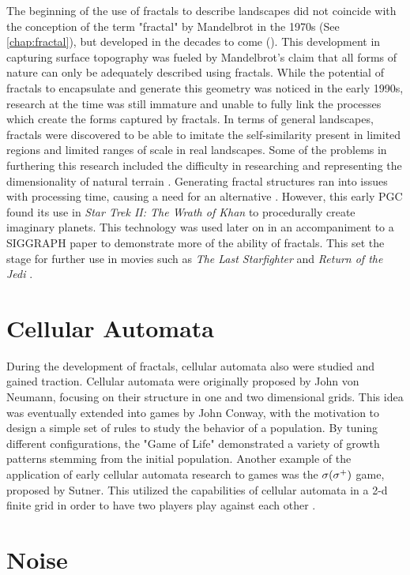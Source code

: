 \documentclass[10pt]{report}
\begin{document}
		The beginning of the use of fractals to describe landscapes did not coincide with the conception of the term "fractal" by Mandelbrot in the 1970s (See \autoref{chap:fractal}), but developed in the decades to come (). This development in capturing surface topography was fueled by Mandelbrot's claim that all forms of nature can only be adequately described using fractals. While the potential of fractals to encapsulate and generate this geometry was noticed in the early 1990s, research at the time was still immature and unable to fully link the processes which create the forms captured by fractals. In terms of general landscapes, fractals were discovered to be able to imitate the self-similarity present in limited regions and limited ranges of scale in real landscapes. Some of the problems in furthering this research included the difficulty in researching and representing the dimensionality of natural terrain \cite{XU1993245}. Generating fractal structures ran into issues with processing time, causing a need for an alternative \cite{inbook}. However, this early PGC found its use in \emph{Star Trek II: The Wrath of Khan} \cite{startrek} to procedurally create imaginary planets. This technology was used later on in an accompaniment to a SIGGRAPH paper to demonstrate more of the ability of fractals. This set the stage for further use in movies such as \emph{The Last Starfighter} and \emph{Return of the Jedi} \cite{ibm-fractal}. 
		
		\section{Cellular Automata}
		
		During the development of fractals, cellular automata also were studied and gained traction. Cellular automata were originally proposed by John von Neumann, focusing on their structure in one and two dimensional grids. This idea was eventually extended into games by John Conway, with the motivation to design a simple set of rules to study the behavior of a population. By tuning different configurations, the "Game of Life" demonstrated a variety of growth patterns stemming from the initial population. Another example of the application of early cellular automata research to games was the \(\sigma(\sigma\textsuperscript{+})\) game, proposed by Sutner. This utilized the capabilities of cellular automata in a 2-d finite grid in order to have two players play against each other \cite{10.1145/349194.349202}.
		
		\section{Noise}
		
\end{document}
